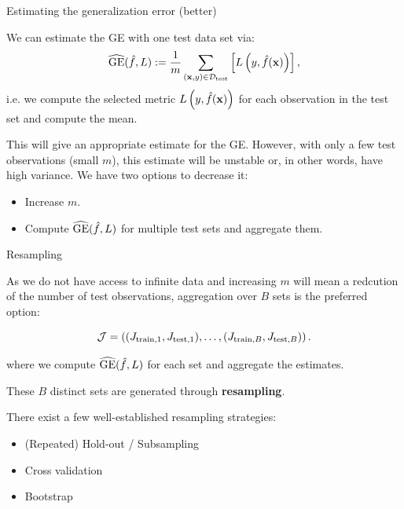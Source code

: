 \documentclass[11pt,compress,t,notes=noshow, xcolor=table]{beamer}
\begin{document}
\begin{vbframe}{Estimating the generalization error (better)}

We can estimate the GE with one test data set via:  $$\widehat{\mathrm{GE}}(\hat{f}, L) := \frac{1}{m}\sum_{(\mathbf{x}, y) \in \mathcal{D}_{\text{test}}} \left[ L\left(y, \hat{f}(\mathbf{x})\right) \right],$$ 
i.e. we compute the selected metric $L\left(y, \hat{f}(\mathbf{x})\right)$ for each observation in the test set and compute the mean.

\vspace{0.2cm}
This will give an appropriate estimate for the GE.
However, with only a few test observations (small $m$), this estimate will be unstable or, in other words, have high variance.
We have two options to decrease it:

\begin{itemize}
\item Increase $m$.
\item Compute $\widehat{\mathrm{GE}}(\hat{f}, L)$ for multiple test sets and aggregate them.
\end{itemize}

\end{vbframe}

\begin{vbframe}{Resampling}

As we do not have access to infinite data and increasing $m$ will mean a redcution of the number of test observations, aggregation over $B$ sets is the preferred option:

$$\mathcal{J} = \left((J_{\mathrm{train},1}, J_{\mathrm{test},1}),\dots,(J_{\mathrm{train},B}, J_{\mathrm{test},B})\right).$$

where we compute $\widehat{\mathrm{GE}}(\hat{f}, L)$ for each set and aggregate the estimates.

These $B$ distinct sets are generated through \textbf{resampling}.

\vspace{0.2cm}

There exist a few well-established resampling strategies:

\begin{itemize}
\item (Repeated) Hold-out / Subsampling
\item Cross validation
\item Bootstrap
\end{itemize}

\end{vbframe}
\end{document}
